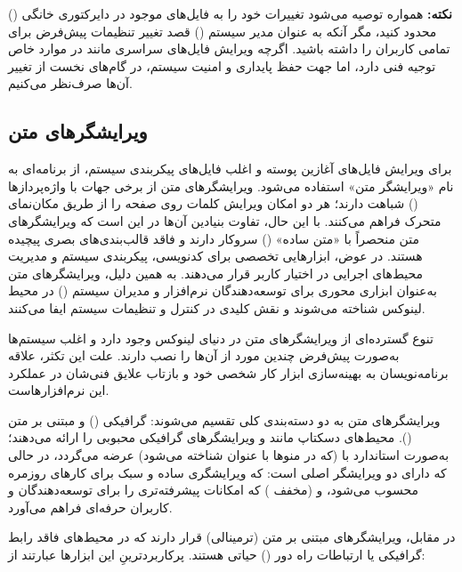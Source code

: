 \begin{note}
\textbf{نکته:} همواره توصیه می‌شود تغییرات خود را به فایل‌های موجود در دایرکتوری خانگی () محدود کنید، مگر آنکه به عنوان مدیر سیستم () قصد تغییر تنظیمات پیش‌فرض برای تمامی کاربران را داشته باشید. اگرچه ویرایش فایل‌های سراسری مانند  در موارد خاص توجیه فنی دارد، اما جهت حفظ پایداری و امنیت سیستم، در گام‌های نخست از تغییر آن‌ها صرف‌نظر می‌کنیم.
\end{note}

\subsection{ویرایشگرهای متن}

برای ویرایش فایل‌های آغازین پوسته و اغلب فایل‌های پیکربندی سیستم، از برنامه‌ای به نام «ویرایشگر متن» استفاده می‌شود. ویرایشگرهای متن از برخی جهات با واژه‌پردازها () شباهت دارند؛ هر دو امکان ویرایش کلمات روی صفحه را از طریق مکان‌نمای متحرک فراهم می‌کنند. با این حال، تفاوت بنیادین آن‌ها در این است که ویرایشگرهای متن منحصراً با «متن ساده» () سروکار دارند و فاقد قالب‌بندی‌های بصری پیچیده هستند. در عوض، ابزارهایی تخصصی برای کدنویسی، پیکربندی سیستم و مدیریت محیط‌های اجرایی در اختیار کاربر قرار می‌دهند. به همین دلیل، ویرایشگرهای متن به‌عنوان ابزاری محوری برای توسعه‌دهندگان نرم‌افزار و مدیران سیستم () در محیط لینوکس شناخته می‌شوند و نقش کلیدی در کنترل و تنظیمات سیستم ایفا می‌کنند.

تنوع گسترده‌ای از ویرایشگرهای متن در دنیای لینوکس وجود دارد و اغلب سیستم‌ها به‌صورت پیش‌فرض چندین مورد از آن‌ها را نصب دارند. علت این تکثر، علاقه برنامه‌نویسان به بهینه‌سازی ابزار کار شخصی خود و بازتاب علایق فنی‌شان در عملکرد این نرم‌افزارهاست.

ویرایشگرهای متن به دو دسته‌بندی کلی تقسیم می‌شوند: گرافیکی () و مبتنی بر متن (). محیط‌های دسکتاپ مانند  و  ویرایشگرهای گرافیکی محبوبی را ارائه می‌دهند؛  به‌صورت استاندارد با  (که در منوها با عنوان  شناخته می‌شود) عرضه می‌گردد، در حالی که  دارای دو ویرایشگر اصلی است:  که ویرایشگری ساده و سبک برای کارهای روزمره محسوب می‌شود، و  (مخفف ) که امکانات پیشرفته‌تری را برای توسعه‌دهندگان و کاربران حرفه‌ای فراهم می‌آورد.

در مقابل، ویرایشگرهای مبتنی بر متن (ترمینالی) قرار دارند که در محیط‌های فاقد رابط گرافیکی یا ارتباطات راه دور () حیاتی هستند. پرکاربردترینِ این ابزارها عبارتند از:

